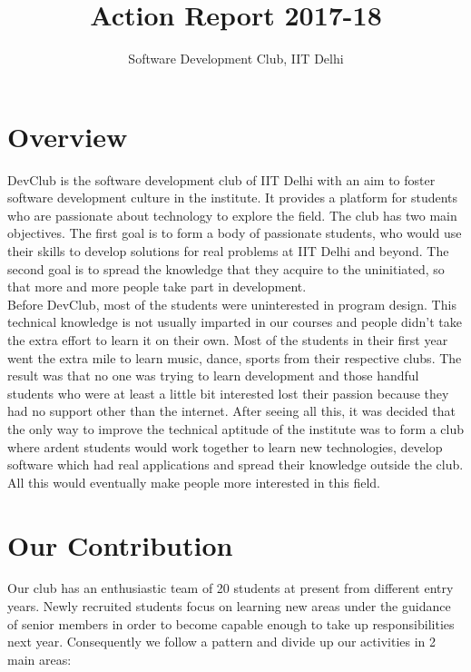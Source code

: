 \documentclass[11pt,a4paper]{article}
\title{Action Report 2017-18}
\author{Software Development Club, IIT Delhi}
\begin{document}
    
    \maketitle
    \section{Overview}
    DevClub is the software development club of IIT Delhi with an aim to foster
    software development culture in the institute. It provides a platform for
    students who are passionate about technology to explore the field. The club
    has two main objectives. The first goal is to form a body of
    passionate students, who would use their skills to develop solutions for real
    problems at IIT Delhi and beyond. The second goal is to spread the knowledge that they
    acquire to the uninitiated, so that more and more people take part in
    development.\\
    
    
    Before DevClub, most of the students were uninterested in program design. This technical knowledge is not usually imparted in our courses and people didn't take the extra effort to learn it on their own. Most of the students in their first year went the extra mile to learn music, dance, sports from their respective clubs. The result was that no one was trying to learn development and those handful students who were at least a little bit interested lost their passion because they had no support other than the internet. After seeing all this, it was decided that the only way to improve the technical aptitude of the institute was to form a club where ardent students would work together to learn new technologies, develop software which had real applications and spread their knowledge outside the club. All this would eventually make people more interested in this field. 
    
    \section{Our Contribution}
    Our club has an enthusiastic team of 20 students at present from different entry years. Newly recruited students focus on learning new areas under the guidance of senior members in order to become capable enough to take up responsibilities next year. Consequently we follow a pattern and divide up our activities in 2 main areas:
\end{document}

